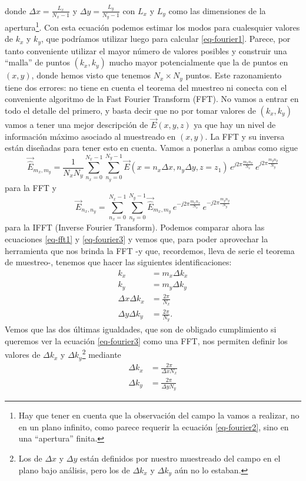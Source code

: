 \documentclass[twocolumn,tikz]{handout}
\begin{document}
\begin{itemize}
donde $\Delta x=\frac{L_{x}}{N_{x}-1}$ y $\Delta
y=\frac{L_{y}}{N_{y}-1}$ con $L_{x}$ y $L_{y}$ como las dimensiones
de la apertura\footnote{Hay que tener en cuenta que la observación
del campo la vamos a realizar, no en un plano infinito, como parece
requerir la ecuación \eqref{eq-fourier2}, sino en una ``apertura''
finita.}. Con esta ecuación podemos estimar los modos para
cualesquier valores de $k_{x}$ y $k_{y}$, que podríamos utilizar
luego para calcular \eqref{eq-fourier1}. Parece, por tanto
conveniente utilizar el mayor número de valores posibles y construir
una ``malla'' de puntos $(k_{x},k_{y})$ mucho mayor potencialmente
que la de puntos en $(x,y)$, donde hemos visto que tenemos
$N_{x}\times N_{y}$ puntos. Este razonamiento tiene dos errores: no
tiene en cuenta el teorema del muestreo ni conecta con el
conveniente algoritmo de la Fast Fourier Transform (FFT). No vamos a
entrar en todo el detalle del primero, y basta decir que no por
tomar valores de $(k_{x},k_{y})$ vamos a tener una mejor descripción
de $\vec{E}(x,y,z)$ ya que hay un nivel de información máximo
asociado al muestreado en $(x,y)$. La FFT y su inversa están
diseñadas para tener esto en cuenta. Vamos a ponerlas a ambas como
sigue
\begin{equation}
\vec{\hat{E}}_{m_{x},m_{y}}=\frac{1}{N_{x} N_{y}}
\sum_{n_{x}=0}^{N_{x}-1}\sum_{n_{y}=0}^{N_{y}-1}
\vec{E}(x=n_{x}\Delta x,n_{y} \Delta y,z=z_{1}) \,e^{j 2\pi
\frac{m_{x} n_{x}}{N_{x}}}\,e^{j 2\pi \frac{m_{y} n_{y}}{N_{y}}}
\label{eq-fft1}
\end{equation}
para la FFT y
\begin{equation}
\vec{E}_{n_{x},n_{y}}=
\sum_{n_{x}=0}^{N_{x}-1}\sum_{n_{y}=0}^{N_{y}-1}
\vec{\hat{E}}_{m_{x},m_{y}} \,e^{-j 2\pi \frac{m_{x}
n_{x}}{N_{x}}}\,e^{-j 2\pi \frac{m_{y} n_{y}}{N_{y}}}
\label{eq-ifft1}
\end{equation}
para la IFFT (Inverse Fourier Transform). Podemos comparar ahora las
ecuaciones \eqref{eq-fft1} y \eqref{eq-fourier3} y vemos que, para
poder aprovechar la herramienta que nos brinda la FFT -y que,
recordemos, lleva de serie el teorema de muestreo-, tenemos que
hacer las siguientes identificaciones:
\begin{subequations}
\begin{align}
k_{x}&= m_{x}\Delta k_{x}
\\
k_{y}&= m_{y}\Delta k_{y}
\\
\Delta x \Delta k_{x}&=\frac{2\pi}{N_{x}}
\\
\Delta y \Delta k_{y}&=\frac{2\pi}{N_{y}}.
\end{align}
\end{subequations}
Vemos que las dos últimas igualdades, que son de obligado
cumplimiento si queremos ver la ecuación \eqref{eq-fourier3} como
una FFT, nos permiten definir los valores de $\Delta k_{x}$ y
$\Delta k_{y}$\footnote{Los de $\Delta x$ y $\Delta y$ están
definidos por nuestro muestreado del campo en el plano bajo
análisis, pero los de $\Delta k_{x}$ y $\Delta k_{y}$ aún no lo
estaban.} mediante
\begin{align}
\Delta k_{x}&=\frac{2\pi}{\Delta x N_{x}}
\\
\Delta k_{y}&=\frac{2\pi}{\Delta y N_{y}}
\end{align}


\end{itemize}
\end{document}
